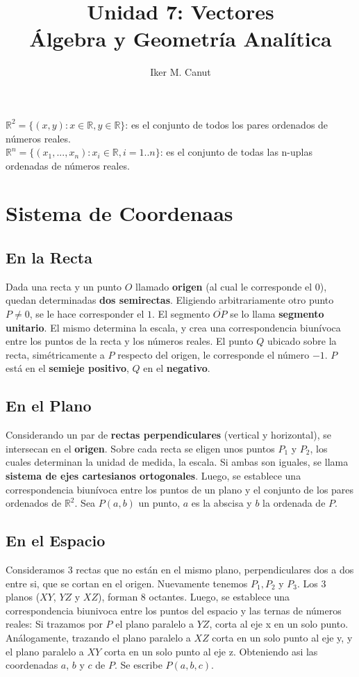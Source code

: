\documentclass[11pt,a4paper]{article}
\author{Iker M. Canut}
\title{Unidad 7: Vectores\\\'Algebra y Geometr\'ia Anal\'itica}
\begin{document}
\maketitle
\newpage

\noindent $\mathbb{R}^2 = \{(x,y) : x\in\mathbb{R}, y\in\mathbb{R}\}$: es el conjunto de todos los pares ordenados de n\'umeros reales.\\
\noindent $\mathbb{R}^n = \{(x_1,...,x_n) : x_i\in\mathbb{R}, i=1..n\}$: es el conjunto de todas las n-uplas ordenadas de n\'umeros reales.

\section{Sistema de Coordenaas}
\subsection{En la Recta}
\noindent Dada una recta y un punto $O$ llamado \textbf{origen} (al cual le corresponde el 0), quedan determinadas \textbf{dos semirectas}. Eligiendo arbitrariamente otro punto $P\not=0$, se le hace corresponder el $1$. El segmento $\overline{OP}$ se lo llama \textbf{segmento unitario}. El mismo determina la escala, y crea una correspondencia biun\'ivoca entre los puntos de la recta y los n\'umeros reales. El punto $Q$ ubicado sobre la recta, sim\'etricamente a $P$ respecto del origen, le corresponde el n\'umero $-1$. $P$ est\'a en el \textbf{semieje positivo}, $Q$ en el \textbf{negativo}.
\subsection{En el Plano}
Considerando un par de \textbf{rectas perpendiculares} (vertical y horizontal), se intersecan en el \textbf{origen}. Sobre cada recta se eligen unos puntos $P_1$ y $P_2$, los cuales determinan la unidad de medida, la escala. Si ambas son iguales, se llama \textbf{sistema de ejes cartesianos ortogonales}. Luego, se establece una correspondencia biunívoca entre los puntos de un plano y el conjunto de los pares ordenados de $\mathbb{R}^2$. Sea $P(a,b)$ un punto, $a$ es la abscisa y $b$ la ordenada de $P$.
\subsection{En el Espacio}
Consideramos 3 rectas que no est\'an en el mismo plano, perpendiculares dos a dos entre si, que se cortan en el origen. Nuevamente tenemos $P_1, P_2$ y $P_3$. Los 3 planos ($XY$, $YZ$ y $XZ$), forman 8 octantes. Luego, se establece una correspondencia biunivoca entre los puntos del espacio y las ternas de n\'umeros reales: Si trazamos por $P$ el plano paralelo a $YZ$, corta al eje x en un solo punto. An\'alogamente, trazando el plano paralelo a $XZ$ corta en un solo punto al eje y, y el plano paralelo a $XY$ corta en un solo punto al eje z. Obteniendo asi las coordenadas $a$, $b$ y $c$ de $P$. Se escribe $P(a,b,c)$.
\end{document}
